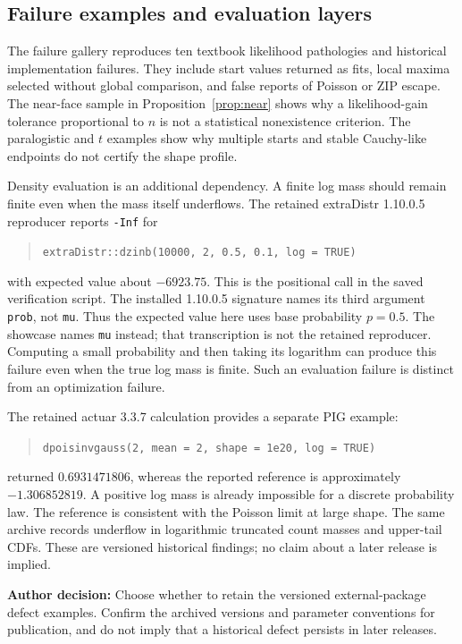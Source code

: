 \documentclass[12pt]{article}
\theoremstyle{definition}
\theoremstyle{remark}
\newcommand{\todo}[1]{\par\smallskip\noindent\textcolor{red!65!black}{\textbf{Author decision:} #1}\par\smallskip}
\newcommand{\code}[1]{\nolinkurl{#1}}
\begin{document}
\subsection{Failure examples and evaluation layers}
The failure gallery reproduces ten textbook likelihood pathologies and
historical implementation failures. They include start values returned as
fits, local maxima selected without global comparison, and false reports
of Poisson or ZIP escape. The near-face sample in
Proposition~\ref{prop:near} shows why a likelihood-gain tolerance proportional
to $n$ is not a statistical nonexistence criterion. The paralogistic and
$t$ examples show why multiple starts and stable Cauchy-like endpoints
do not certify the shape profile.

Density evaluation is an additional dependency. A finite log mass should
remain finite even when the mass itself underflows. The retained
extraDistr 1.10.0.5 reproducer reports \code{-Inf} for
\begin{quote}\small
\verb|extraDistr::dzinb(10000, 2, 0.5, 0.1, log = TRUE)|
\end{quote}
with expected value about $-6923.75$. This is the positional call in the
saved verification script. The installed 1.10.0.5 signature names its third
argument \code{prob}, not \code{mu}. Thus the expected value here uses
base probability $p=0.5$. The showcase names \code{mu} instead; that
transcription is not the retained reproducer. Computing a small probability and then taking its logarithm can produce
this failure even when the true log mass is finite. Such an evaluation
failure is distinct from an optimization failure.

The retained actuar 3.3.7 calculation provides a separate PIG example:
\begin{quote}\small
\verb|dpoisinvgauss(2, mean = 2, shape = 1e20, log = TRUE)|
\end{quote}
returned $0.6931471806$, whereas the reported reference is approximately
$-1.306852819$. A positive log mass is already impossible for a discrete
probability law. The reference is consistent with the Poisson limit at
large shape. The same archive records underflow in logarithmic truncated
count masses and upper-tail CDFs. These are versioned historical findings;
no claim about a later release is implied.
\todo{Choose whether to retain the versioned external-package defect examples. Confirm the archived versions and parameter conventions for publication, and do not imply that a historical defect persists in later releases.}
\end{document}
